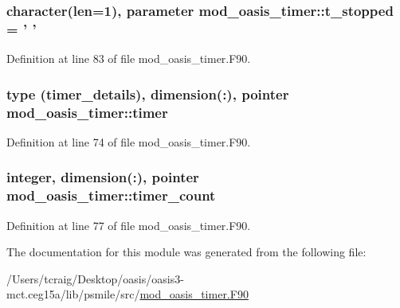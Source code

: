 \hypertarget{classmod__oasis__timer_aceca66a08f073eb12f2643edc7c400fe}{
\subsubsection[{t\+\_\+stopped}]{\setlength{\rightskip}{0pt plus 5cm}character(len=1), parameter mod\+\_\+oasis\+\_\+timer\+::t\+\_\+stopped = ' '\hspace{0.3cm}{\ttfamily [private]}}}\label{classmod__oasis__timer_aceca66a08f073eb12f2643edc7c400fe}


Definition at line 83 of file mod\+\_\+oasis\+\_\+timer.\+F90.

\hypertarget{classmod__oasis__timer_a8a4b64983bdf68b795ab2112bc02b8bc}{
\subsubsection[{timer}]{\setlength{\rightskip}{0pt plus 5cm}type ({\bf timer\+\_\+details}), dimension(\+:), pointer mod\+\_\+oasis\+\_\+timer\+::timer\hspace{0.3cm}{\ttfamily [private]}}}\label{classmod__oasis__timer_a8a4b64983bdf68b795ab2112bc02b8bc}


Definition at line 74 of file mod\+\_\+oasis\+\_\+timer.\+F90.

\hypertarget{classmod__oasis__timer_a225db1b2b8bd57f0567d37b5c4d00ca3}{
\subsubsection[{timer\+\_\+count}]{\setlength{\rightskip}{0pt plus 5cm}integer, dimension(\+:), pointer mod\+\_\+oasis\+\_\+timer\+::timer\+\_\+count\hspace{0.3cm}{\ttfamily [private]}}}\label{classmod__oasis__timer_a225db1b2b8bd57f0567d37b5c4d00ca3}


Definition at line 77 of file mod\+\_\+oasis\+\_\+timer.\+F90.



The documentation for this module was generated from the following file\+:\begin{DoxyCompactItemize}
\item 
/\+Users/tcraig/\+Desktop/oasis/oasis3-\/mct.\+ceg15a/lib/psmile/src/\hyperlink{mod__oasis__timer_8_f90}{mod\+\_\+oasis\+\_\+timer.\+F90}\end{DoxyCompactItemize}
